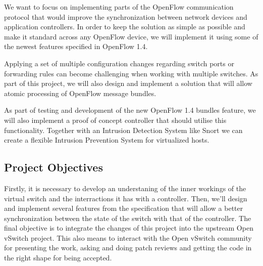 We want to focus on implementing parts of the OpenFlow communication protocol that would improve
the synchronization between network devices and application controllers. In order to keep the solution
as simple as possible and make it standard across any OpenFlow device, we will implement it using
some of the newest features specified in OpenFlow 1.4.

Applying a set of multiple configuration changes regarding switch ports or forwarding rules can become
challenging when working with multiple switches. As part of this project, we will also design and implement
a solution that will allow atomic processing of OpenFlow message bundles.

As part of testing and development of the new OpenFlow 1.4 bundles feature, we will also implement a proof of concept
controller that should utilise this functionality. Together with an Intrusion Detection System like Snort\cite{snort}
we can create a flexible Intrusion Prevention System for virtualized hosts.


\subsection{Project Objectives}
\label{sub-sec:proj-objectives}

Firstly, it is necessary to develop an understaning of the inner workings of the virtual switch and the interractions
it has with a controller. Then, we'll design and implement several features from the specification that will
allow a better synchronization between the state of the switch with that of the controller. The final objective
is to integrate the changes of this project into the upstream Open vSwitch project. This also means to interact
with the Open vSwitch community for presenting the work, asking and doing patch reviews and getting the code in
the right shape for being accepted.



